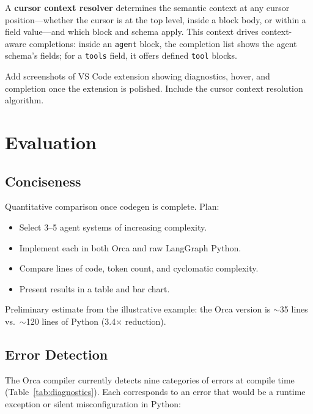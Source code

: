 \documentclass[sigconf,nonacm]{acmart}
\begin{document}
A \textbf{cursor context resolver} determines the semantic context at any
cursor position---whether the cursor is at the top level, inside a block
body, or within a field value---and which block and schema apply. This
context drives context-aware completions: inside an \texttt{agent} block,
the completion list shows the agent schema's fields; for a \texttt{tools}
field, it offers defined \texttt{tool} blocks.

\begin{todobox}
Add screenshots of VS Code extension showing diagnostics, hover, and
completion once the extension is polished. Include the cursor context
resolution algorithm.
\end{todobox}

\section{Evaluation}
\label{sec:evaluation}

\subsection{Conciseness}
\label{sec:eval:conciseness}

\begin{todobox}
Quantitative comparison once codegen is complete. Plan:
\begin{itemize}
  \item Select 3--5 agent systems of increasing complexity.
  \item Implement each in both Orca and raw LangGraph Python.
  \item Compare lines of code, token count, and cyclomatic complexity.
  \item Present results in a table and bar chart.
\end{itemize}
Preliminary estimate from the illustrative example: the Orca version is
$\sim$35 lines vs.\ $\sim$120 lines of Python (3.4$\times$ reduction).
\end{todobox}

\subsection{Error Detection}
\label{sec:eval:errors}

The Orca compiler currently detects nine categories of errors at compile
time (Table~\ref{tab:diagnostics}). Each corresponds to an error that
would be a runtime exception or silent misconfiguration in Python:
\end{document}
